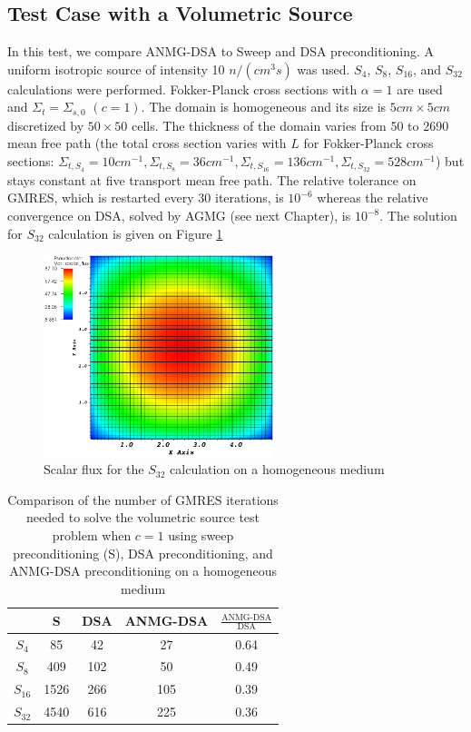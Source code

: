 \subsection{Test Case with a Volumetric Source}
In this test, we compare ANMG-DSA to Sweep and DSA preconditioning. A uniform
isotropic source of intensity 10 $n/(cm^3 s)$ was used. $S_4$, $S_8$, $S_{16}$, and
$S_{32}$ calculations were performed. Fokker-Planck cross sections with
$\alpha=1$ are used and $\Sigma_t = \Sigma_{s,0}$ $(c=1)$. The domain is homogeneous
and its size is $5cm \times 5cm$ discretized by $50\times 50$ cells. The 
thickness of the domain varies from 50 to 2690 mean free path (the total cross 
section varies with $L$ for Fokker-Planck cross sections: $\Sigma_{t,S_4}=10cm^{-1},
\Sigma_{t,S_8}=36cm^{-1}, \Sigma_{t,S_{16}}=136cm^{-1}, 
\Sigma_{t,S_{32}}=528cm^{-1}$) but stays constant at five transport
mean free path. The relative tolerance on GMRES, which is restarted every 30
iterations, is $10^{-6}$ whereas the
relative convergence on DSA, solved by AGMG (see next Chapter), is $10^{-8}$.
The solution for $S_{32}$ calculation is given on Figure \ref{fig_s_32}
\begin{figure}[H]
  \centering
  \includegraphics[width=0.6\textwidth]{Anmg/homog_anmg_crop}
  \caption{Scalar flux for the $S_{32}$ calculation on a homogeneous medium}
  \label{fig_s_32}
\end{figure}
\begin{table}[H]
  \begin{center}
    \caption{Comparison of the number of GMRES iterations needed to solve the 
      volumetric source test problem when $c=1$ using sweep preconditioning (S), DSA 
    preconditioning, and ANMG-DSA preconditioning on a homogeneous medium}
    \begin{tabular}{|c|c|c|c|c|}
      \hline
      & S & DSA & ANMG-DSA & $\frac{\textrm{ANMG-DSA}}{\textrm{DSA}}$ \\
      \hline
      $S_4$ & 85   & 42  & 27  & 0.64 \\
      $S_8$ & 409  & 102 & 50  & 0.49 \\
   $S_{16}$ & 1526 & 266 & 105 & 0.39 \\
   $S_{32}$ & 4540 & 616 & 225 & 0.36 \\
      \hline
    \end{tabular}
    \label{table_gmres_homog}
  \end{center}
\end{table}
